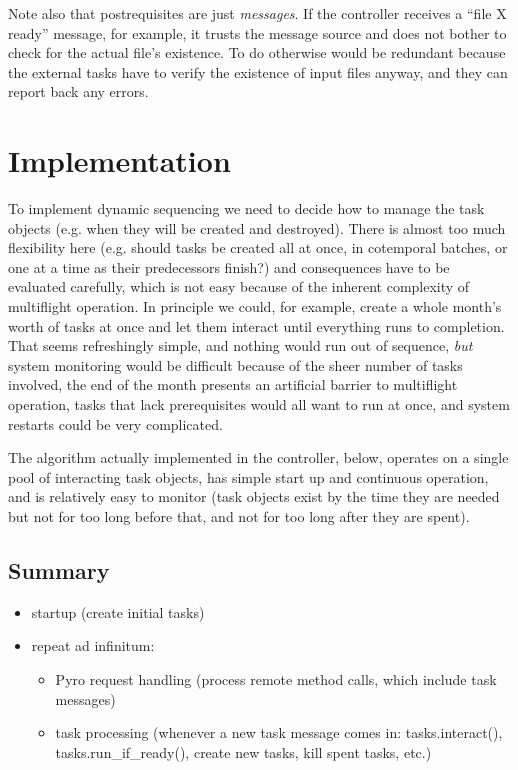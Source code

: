 \documentclass[a4paper,12pt]{amsart}
\begin{document}
Note also that postrequisites are just {\em messages}. If the controller
receives a ``file X ready'' message, for example, it trusts the message
source and does not bother to check for the actual file's existence. To
do otherwise would be redundant because the external tasks have to
verify the existence of input files anyway, and they can report back any
errors.


\section{Implementation}

To implement dynamic sequencing we need to decide how to manage the task
objects (e.g. when they will be created and destroyed). There is almost
too much flexibility here (e.g.  should tasks be created all at once, in
cotemporal batches, or one at a time as their predecessors finish?) and
consequences have to be evaluated carefully, which is not easy because
of the inherent complexity of multiflight operation. In principle we
could, for example, create a whole month's worth of tasks at once and
let them interact until everything runs to completion. That seems
refreshingly simple, and nothing would run out of sequence, {\em but}
system monitoring would be difficult because of the sheer number of
tasks involved, the end of the month presents an artificial barrier to
multiflight operation, tasks that lack prerequisites would all want to
run at once, and system restarts could be very complicated. 

The algorithm actually implemented in the controller, below, operates on
a single pool of interacting task objects, has simple start up and
continuous operation, and is relatively easy to monitor (task objects
exist by the time they are needed but not for too long before that, and
not for too long after they are spent). 

\subsection{Summary}

\begin{itemize}
    \item startup (create initial tasks)
    \item repeat ad infinitum:
    \begin{itemize}
        \item Pyro request handling (process remote method calls, which
        include task messages)
        \item task processing (whenever a new task message comes in:
        tasks.interact(), tasks.run\_if\_ready(), create new tasks, kill
        spent tasks, etc.)
    \end{itemize}
\end{itemize}
\end{document}
